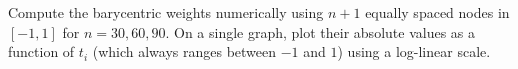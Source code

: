 \begin{statement}{4}
  Compute the barycentric weights numerically using $n + 1$ equally spaced nodes in $[-1, 1]$
  for $n = 30, 60, 90$. On a single graph, plot their absolute values as a function of $t_i$
  (which always ranges between $-1$ and $1$) using a log-linear scale.
\end{statement}